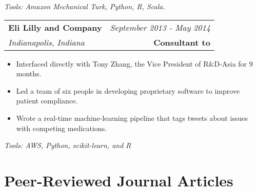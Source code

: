 \documentclass[10pt,a4paper]{article}
\begin{document}
  \vspace*{2mm}\setlength\parindent{2mm}\begin{minipage}{16.8cm}
    \textit{Tools: Amazon Mechanical Turk, Python, R, Scala.}
  \end{minipage}

  \vspace*{3mm}\noindent\begin{tabularx}{17cm}{X r}
    \textbf{Eli Lilly and Company} & \textit{September 2013 - May 2014} \\
    \textit{Indianapolis, Indiana} & \textbf{Consultant to} 
  \end{tabularx}

  \vspace*{1mm}\noindent\begin{minipage}{17cm}
    \begin{itemize}[leftmargin=6mm,topsep=0mm,itemsep=-1mm]
      \item Interfaced directly with Tony Zhang, the Vice President of R\&D-Asia for 9 months.
      \item Led a team of six people in developing proprietary software to improve patient compliance.
      \item Wrote a real-time machine-learning pipeline that tags tweets about issues with competing medications.
    \end{itemize}
  \end{minipage}

  \vspace*{2mm}\setlength\parindent{2mm}\begin{minipage}{16.8cm}
    \textit{Tools: AWS, Python, scikit-learn, and R} 
  \end{minipage}




  \vspace*{3mm}\section*{Peer-Reviewed Journal Articles} 


\end{document}

